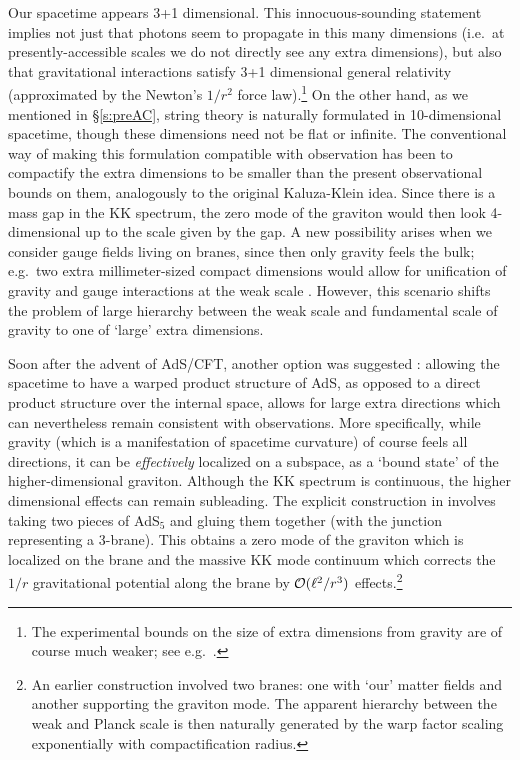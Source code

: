 \documentclass[12pt,a4paper]{article}
\def\sect#1{\S\ref{#1}}
\def\AC{AdS/CFT}
\def\Rads{\ell}
\begin{document}
Our spacetime appears 3+1 dimensional.  This innocuous-sounding statement implies not just that photons seem to propagate in this many dimensions (i.e.\ at presently-accessible scales we do not directly see any extra dimensions), but also that gravitational interactions satisfy 3+1 dimensional general relativity (approximated by the Newton's $1/r^2$ force law).\footnote{
The experimental bounds on the size of extra dimensions from gravity are of course much weaker; see e.g.\ \cite{ArkaniHamed:1998nn}.
}
On the other hand, as we mentioned in \sect{s:preAC}, string theory is naturally formulated in 10-dimensional spacetime, though these dimensions need not be flat or infinite.  The conventional way of making this formulation compatible with  observation has been to compactify the extra dimensions to be smaller than the present observational bounds on them, analogously to the original Kaluza-Klein idea.  Since there is a mass gap in the KK spectrum, the zero mode of the graviton would then look 4-dimensional up to the scale given by the gap.  A new possibility arises when we consider  gauge fields living on branes, since then only gravity feels the bulk; e.g.\ two extra millimeter-sized compact dimensions would allow for unification of gravity and gauge interactions at the weak scale  \cite{ArkaniHamed:1998rs}.
However, this scenario shifts the problem of large hierarchy between the weak scale and fundamental scale of gravity to one of `large' extra dimensions.

 Soon after the advent of \AC, another option was suggested \cite{Randall:1999vf}: allowing the spacetime to have a warped product structure of AdS, as opposed to a direct product structure over the internal space, allows for large extra directions which can nevertheless remain consistent with observations.
 More specifically, while gravity (which is a manifestation of spacetime curvature) of course feels all directions, it can be {\it effectively} localized on a subspace, as a `bound state' of the higher-dimensional graviton.  Although the KK spectrum is continuous, the higher dimensional effects can remain subleading. The explicit construction in \cite{Randall:1999vf} involves taking two pieces of AdS$_5$ and gluing them together (with the junction representing a 3-brane).  This obtains a zero mode of the graviton which is localized on the brane and the massive KK mode continuum which corrects the $1/r$ gravitational potential along the brane by ${\cal O}(\Rads^2/r^3)$ effects.\footnote{
An earlier construction   \cite{Randall:1999ee} involved two branes: one with `our' matter fields and another supporting the graviton mode.
The apparent hierarchy between the weak and Planck scale is then naturally generated by the warp factor scaling exponentially with compactification radius.
}
\end{document}
